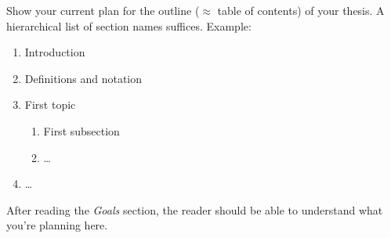Show your current plan for the outline ($\approx$ table of contents) of your thesis.
A hierarchical list of section names suffices.
Example:

\begin{enumerate}
  \item Introduction
  \item Definitions and notation
  \item First topic
  \begin{enumerate}
    \item First subsection 
    \item \dots
  \end{enumerate}
  \item \dots
\end{enumerate}
After reading the \emph{Goals} section, the reader should be able to understand what you're planning here.
